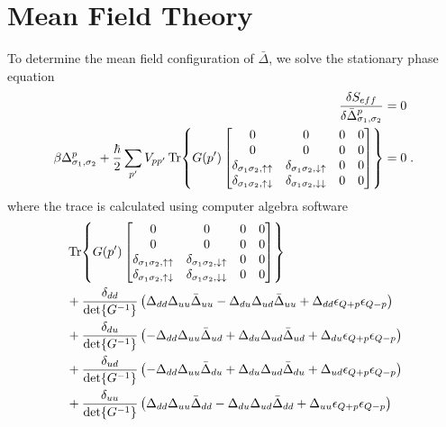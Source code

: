 \documentclass{article}
\begin{document}
\section{Mean Field Theory}
To determine the mean field configuration of $\bar{\Delta}$, we solve the stationary phase equation
\begin{align}
    \frac{\delta S_{eff}}{\delta \bar{\Delta}_{\sigma_1,\sigma_2}^{p}} &= 0 \nonumber\\
    \beta \Delta_{\sigma_1,\sigma_2}^p + \frac{\hbar}{2} \sum_{p'} V_{pp'} \Tr{G(p') 
    \begin{bmatrix}
    0 & 0 & 0 & 0 \\
    0 & 0 & 0 & 0 \\ 
    \delta_{\sigma_1 \sigma_2, \uparrow \uparrow} & \delta_{\sigma_1 \sigma_2, \downarrow \uparrow}  & 0 & 0 \\ 
    \delta_{\sigma_1 \sigma_2, \uparrow \downarrow} & \delta_{\sigma_1 \sigma_2, \downarrow \downarrow} & 0 & 0
    \end{bmatrix}} &= 0\;. \label{stationary phase delta}
\end{align}
where the trace is calculated using computer algebra software
\begin{align}
&\Tr{G(p') 
    \begin{bmatrix}
    0 & 0 & 0 & 0 \\
    0 & 0 & 0 & 0 \\ 
    \delta_{\sigma_1 \sigma_2, \uparrow \uparrow} & \delta_{\sigma_1 \sigma_2, \downarrow \uparrow}  & 0 & 0 \\ 
    \delta_{\sigma_1 \sigma_2, \uparrow \downarrow} & \delta_{\sigma_1 \sigma_2, \downarrow \downarrow} & 0 & 0
    \end{bmatrix}} \\
&+ \frac{\delta_{dd}}{\det{G^{-1}}} \left(\Delta_{dd} \Delta_{uu} \bar{\Delta}_{uu} - \Delta_{du} \Delta_{ud} \bar{\Delta}_{uu} + \Delta_{dd} \epsilon_{Q+p} \epsilon_{Q-p}\right)\\ 
%
&+ \frac{\delta_{du}}{\det{G^{-1}}} \left(- \Delta_{dd} \Delta_{uu} \bar{\Delta}_{ud} + \Delta_{du} \Delta_{ud} \bar{\Delta}_{ud} + \Delta_{du} \epsilon_{Q+p} \epsilon_{Q-p}\right)\\
%
&+ \frac{\delta_{ud}}{\det{G^{-1}}} \left(- \Delta_{dd} \Delta_{uu} \bar{\Delta}_{du} + \Delta_{du} \Delta_{ud} \bar{\Delta}_{du} + \Delta_{ud} \epsilon_{Q+p} \epsilon_{Q-p}\right)\\
%
&+ \frac{\delta_{uu}}{\det{G^{-1}}} \left(\Delta_{dd} \Delta_{uu} \bar{\Delta}_{dd} - \Delta_{du} \Delta_{ud} \bar{\Delta}_{dd} + \Delta_{uu} \epsilon_{Q+p} \epsilon_{Q-p}\right)\\
\end{align}
\end{document}
